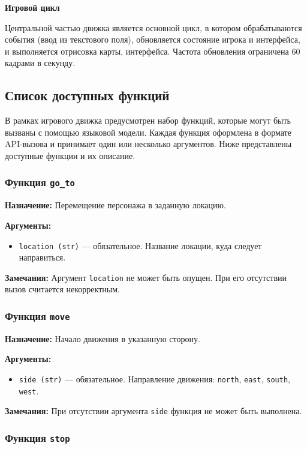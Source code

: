 \documentclass[14pt]{extarticle}
\begin{document}
\item \textbf{Игровой цикл}

Центральной частью движка является основной цикл, в котором обрабатываются события (ввод из текстового поля), обновляется состояние игрока и интерфейса, и выполняется отрисовка карты, интерфейса. Частота обновления ограничена 60 кадрами в секунду.

\subsection{Список доступных функций}
В рамках игрового движка предусмотрен набор функций, которые могут быть вызваны с помощью языковой модели. Каждая функция оформлена в формате API-вызова и принимает один или несколько аргументов. Ниже представлены доступные функции и их описание.

\subsubsection{Функция \texttt{go\_to}}

\textbf{Назначение:} Перемещение персонажа в заданную локацию.

\textbf{Аргументы:}
\begin{itemize}
    \item \texttt{location (str)} --- обязательное. Название локации, куда следует направиться.
\end{itemize}

\textbf{Замечания:} Аргумент \texttt{location} не может быть опущен. При его отсутствии вызов считается некорректным.

\subsubsection{Функция \texttt{move}}

\textbf{Назначение:} Начало движения в указанную сторону.

\textbf{Аргументы:}
\begin{itemize}
    \item \texttt{side (str)} --- обязательное. Направление движения: \texttt{north}, \texttt{east}, \texttt{south}, \texttt{west}.
\end{itemize}

\textbf{Замечания:} При отсутствии аргумента \texttt{side} функция не может быть выполнена.

\subsubsection{Функция \texttt{stop}}
\end{document}

